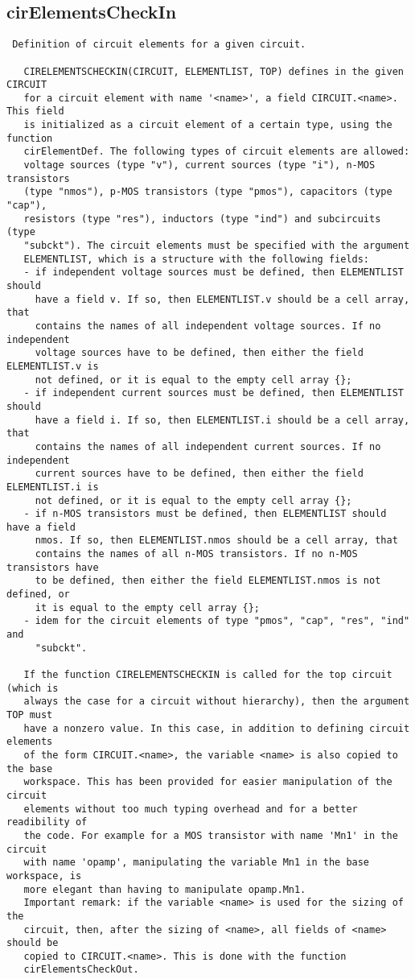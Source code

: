 \newpage
\subsection{cirElementsCheckIn}
\label{sec:cirElementsCheckIn}
\begin{verbatim}
 Definition of circuit elements for a given circuit.
 
   CIRELEMENTSCHECKIN(CIRCUIT, ELEMENTLIST, TOP) defines in the given CIRCUIT
   for a circuit element with name '<name>', a field CIRCUIT.<name>. This field
   is initialized as a circuit element of a certain type, using the function
   cirElementDef. The following types of circuit elements are allowed:
   voltage sources (type "v"), current sources (type "i"), n-MOS transistors
   (type "nmos"), p-MOS transistors (type "pmos"), capacitors (type "cap"),
   resistors (type "res"), inductors (type "ind") and subcircuits (type
   "subckt"). The circuit elements must be specified with the argument
   ELEMENTLIST, which is a structure with the following fields:
   - if independent voltage sources must be defined, then ELEMENTLIST should
     have a field v. If so, then ELEMENTLIST.v should be a cell array, that
     contains the names of all independent voltage sources. If no independent
     voltage sources have to be defined, then either the field ELEMENTLIST.v is
     not defined, or it is equal to the empty cell array {}; 
   - if independent current sources must be defined, then ELEMENTLIST should
     have a field i. If so, then ELEMENTLIST.i should be a cell array, that
     contains the names of all independent current sources. If no independent
     current sources have to be defined, then either the field ELEMENTLIST.i is
     not defined, or it is equal to the empty cell array {};
   - if n-MOS transistors must be defined, then ELEMENTLIST should have a field
     nmos. If so, then ELEMENTLIST.nmos should be a cell array, that
     contains the names of all n-MOS transistors. If no n-MOS transistors have
     to be defined, then either the field ELEMENTLIST.nmos is not defined, or
     it is equal to the empty cell array {}; 
   - idem for the circuit elements of type "pmos", "cap", "res", "ind" and
     "subckt".
 
   If the function CIRELEMENTSCHECKIN is called for the top circuit (which is
   always the case for a circuit without hierarchy), then the argument TOP must
   have a nonzero value. In this case, in addition to defining circuit elements
   of the form CIRCUIT.<name>, the variable <name> is also copied to the base
   workspace. This has been provided for easier manipulation of the circuit
   elements without too much typing overhead and for a better readibility of
   the code. For example for a MOS transistor with name 'Mn1' in the circuit
   with name 'opamp', manipulating the variable Mn1 in the base workspace, is
   more elegant than having to manipulate opamp.Mn1.
   Important remark: if the variable <name> is used for the sizing of the
   circuit, then, after the sizing of <name>, all fields of <name> should be
   copied to CIRCUIT.<name>. This is done with the function
   cirElementsCheckOut. 
 

\end{verbatim}
